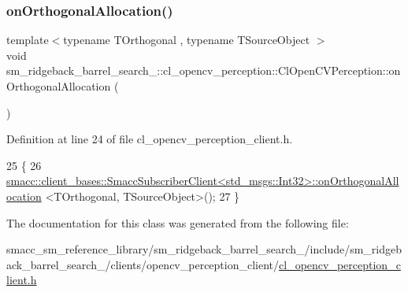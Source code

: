 \subsubsection{\texorpdfstring{on\+Orthogonal\+Allocation()}{onOrthogonalAllocation()}}
{\footnotesize\ttfamily template$<$typename T\+Orthogonal , typename T\+Source\+Object $>$ \\
void sm\+\_\+ridgeback\+\_\+barrel\+\_\+search\+\_\+::cl\+\_\+opencv\+\_\+perception\+::\+Cl\+Open\+C\+V\+Perception\+::on\+Orthogonal\+Allocation (\begin{DoxyParamCaption}{ }\end{DoxyParamCaption})\hspace{0.3cm}{\ttfamily [inline]}}



Definition at line 24 of file cl\+\_\+opencv\+\_\+perception\+\_\+client.\+h.


\begin{DoxyCode}
25   \{
26     
      \hyperlink{classsmacc_1_1client__bases_1_1SmaccSubscriberClient}{smacc::client\_bases::SmaccSubscriberClient<std\_msgs::Int32>::onOrthogonalAllocation}
      <TOrthogonal, TSourceObject>();
27   \}
\end{DoxyCode}


The documentation for this class was generated from the following file\+:\begin{DoxyCompactItemize}
\item 
smacc\+\_\+sm\+\_\+reference\+\_\+library/sm\+\_\+ridgeback\+\_\+barrel\+\_\+search\+\_/include/sm\+\_\+ridgeback\+\_\+barrel\+\_\+search\+\_/clients/opencv\+\_\+perception\+\_\+client/\hyperlink{sm__ridgeback__barrel__search__2_2include_2sm__ridgeback__barrel__search__2_2clients_2opencv__pe24e75f1355e9d616b476e09c054758fe}{cl\+\_\+opencv\+\_\+perception\+\_\+client.\+h}\end{DoxyCompactItemize}
